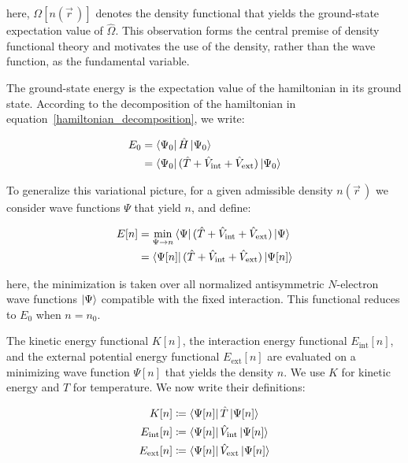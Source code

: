 here, $\Omega[n(\vec{r}\,)]$ denotes the density functional that yields the ground-state expectation value of $\hat{\Omega}$.
This observation forms the central premise of density functional theory and motivates the use of the density, rather than the wave function, as the fundamental variable.

The ground-state energy is the expectation value of the hamiltonian in its ground state.
According to the decomposition of the hamiltonian in equation~\eqref{hamiltonian_decomposition}, we write:

\begin{equation}
\begin{aligned}
    E_0
    &= \bra{\Psi_0}\hat{H}\ket{\Psi_0} \\
    &= \bra{\Psi_0}(\hat{T}+\hat{V}_\mathrm{int}+\hat{V}_\mathrm{ext})\ket{\Psi_0}
\end{aligned}
\label{groundstate_energy_decomposition}
\end{equation}

To generalize this variational picture, for a given admissible density $n(\vec{r}\,)$ we consider wave functions $\Psi$ that yield $n$, and define:

\begin{equation}
\begin{aligned}
    E[n]
    &= \min_{\Psi\to n}\bra{\Psi}(\hat{T}+\hat{V}_\mathrm{int}+\hat{V}_\mathrm{ext})\ket{\Psi} \\
    &= \bra{\Psi[n]}(\hat{T}+\hat{V}_\mathrm{int}+\hat{V}_\mathrm{ext})\ket{\Psi[n]}
\end{aligned}
\label{functional_energy_constrained_search}
\end{equation}

here, the minimization is taken over all normalized antisymmetric $N$-electron wave functions $\ket{\Psi}$ compatible with the fixed interaction.
This functional reduces to $E_0$ when $n=n_0$.

The kinetic energy functional $K[n]$, the interaction energy functional $E_\mathrm{int}[n]$, and the external potential energy functional $E_\mathrm{ext}[n]$ are evaluated on a minimizing wave function $\Psi[n]$ that yields the density $n$.
We use $K$ for kinetic energy and $T$ for temperature.
We now write their definitions:

\begin{equation}
\begin{aligned}
    K[n]&\coloneqq\bra{\Psi[n]}\hat{T}\ket{\Psi[n]} \\
    E_\mathrm{int}[n]&\coloneqq\bra{\Psi[n]}\hat{V}_\mathrm{int}\ket{\Psi[n]} \\
    E_\mathrm{ext}[n]&\coloneqq\bra{\Psi[n]}\hat{V}_\mathrm{ext}\ket{\Psi[n]}
\end{aligned}
\label{functional_T_Eint_Eext_definition}
\end{equation}

